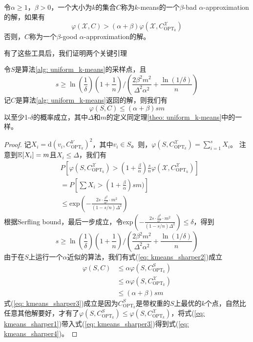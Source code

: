 \begin{definition}[$k$-means问题解的质量2]
    令$\alpha \geq 1$，$\beta > 0$，一个大小为$k$的集合$C$称为$k$-means的一个$\beta$-bad $\alpha$-approximation的解，如果有
    \begin{equation*}
    \varphi(\mathcal{X},C) > (\alpha + \beta)\varphi(\mathcal{X},C_{\text{OPT}_k}^\mathcal{X})
    \end{equation*}
    否则，$C$称为一个$\beta$-good $\alpha$-approximation的解。
\end{definition}
有了这些工具后，我们证明两个关键引理
\begin{lemma}
    \label{lem: S->C}
    令$S$是算法\ref{alg: uniform_k-means}的采样点，且
    \begin{equation*}
    s \geq \ln(\frac{1}{\delta})(1+\frac{1}{n})/(\frac{2\beta^2 m^2}{\Delta^2 \alpha^2}+\frac{\ln(1/\delta)}{n})
    \end{equation*}
    记$C$是算法\ref{alg: uniform_k-means}返回的解，则我们有
    \begin{equation*}
    \varphi(S,C) \leq (\alpha + \beta)sm
    \end{equation*}
    以至少1-$\delta$的概率成立，其中$\Delta$和$m$的定义同定理\ref{theo: uniform_k-means}中的一样。
\end{lemma}
\begin{proof}
    记$X_i = \text{d}(v_i,C_{\text{OPT}_k}^{V})^2$，其中$v_i \in S$。则，$\varphi(S,C_{\text{OPT}_k}^{\mathcal{X}}) = \sum_{i=1}^s X_i$。 注意到$\mathbb{E}[X_i] = m$且$X_i \leq \Delta$，我们有
    \begin{align}
    & P[\varphi(S,C_{\text{OPT}_k}^\mathcal{X}) > (1+\frac{\beta}{\alpha})\frac{s}{n}\varphi(\mathcal{X},C_{\text{OPT}_k}^\mathcal{X})] \label{eq: kmeans_sharper1} \\
    &= P[\sum X_{i}>(1+\frac{\beta}{\alpha}) s m)] \\
    &\leq \text{exp}(-\frac{2 s \cdot \frac{\beta^2}{\alpha^2} \cdot m^2}{(1-s / n) \Delta^2})
    \end{align}
    根据Serfling bound，最后一步成立，令$\text{exp}(-\frac{2 s \cdot \frac{\beta^2}{\alpha^2} \cdot m^2}{(1-s / n) \Delta^2}) \leq \delta$，得到
    \begin{equation*}
    s \geq \ln(\frac{1}{\delta})(1+\frac{1}{n})/(\frac{2\beta^2 m^2}{\Delta^2 \alpha^2}+\frac{\ln(1/\delta)}{n})
    \end{equation*}
    由于在$S$上运行一个$\alpha$近似的算法，我们有式(\ref{eq: kmeans_sharper2})成立
    \begin{align}
    \varphi(S,C) &\leq \alpha\varphi(S,C_{\text{OPT}_k}^S) \label{eq: kmeans_sharper2} \\
    &\leq \alpha\varphi(S,C_{\text{OPT}_k}^{\mathcal{X}}) \label{eq: kmeans_sharper3} \\
    &\leq (\alpha + \beta)sm \label{eq: kmeans_sharper4}
    \end{align}
    式(\ref{eq: kmeans_sharper3})成立是因为$C_{\text{OPT}_k}^S$是带权重的$S$上最优的$k$个点，自然比任意其他解要好，才有了$\varphi(S,C_{\text{OPT}_k}^S) \leq \varphi(S,C_{\text{OPT}_k}^\mathcal{X})$，将式(\ref{eq: kmeans_sharper1})带入式(\ref{eq: kmeans_sharper3})得到式(\ref{eq: kmeans_sharper4})。
\end{proof}

